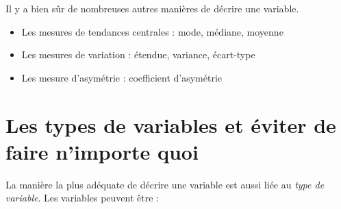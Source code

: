 \documentclass[
]{book}
\providecommand{\tightlist}{%
  \setlength{\itemsep}{0pt}\setlength{\parskip}{0pt}}
\begin{document}
Il y a bien sûr de nombreuses autres manières de décrire une variable.

\begin{itemize}
\tightlist
\item
  Les mesures de tendances centrales : mode, médiane, moyenne
\item
  Les mesures de variation : étendue, variance, écart-type
\item
  Les mesure d'asymétrie : coefficient d'asymétrie
\end{itemize}

\hypertarget{les-types-de-variables-et-uxe9viter-de-faire-nimporte-quoi}{%
\section{Les types de variables et éviter de faire n'importe quoi}\label{les-types-de-variables-et-uxe9viter-de-faire-nimporte-quoi}}

La manière la plus adéquate de décrire une variable est aussi liée au \emph{type de variable}. Les variables peuvent être :
\end{document}
